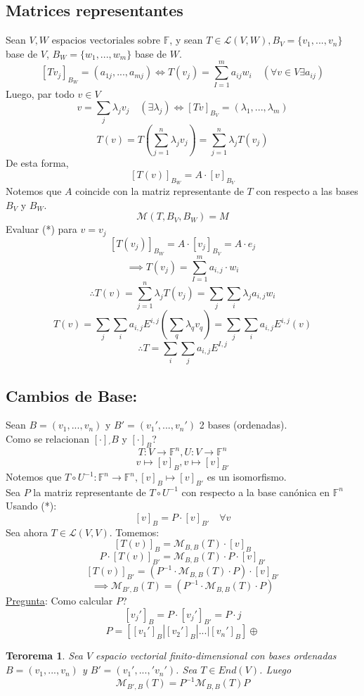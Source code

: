 \documentclass[11pt]{book}
\newtheorem{thm}{Terorema}[section]
\theoremstyle{definition}
\begin{document}
\subsection{Matrices representantes}
Sean $V,W$ espacios vectoriales sobre $\mathbb{F}$, y sean $T\in\mathcal{L}(V,W),B_V=\{v_1,...,v_n\}$ base de $V$, $B_W=\{w_1,...,w_m\}$ base de $W$.
\[ [Tv_j]_{B_W}=(a_{1j},...,a_{mj})\iff T(v_j)=\sum^m_{I=1}a_{ij}w_i\quad (\forall v\in V \exists a_{ij})\]
Luego, par todo $v\in V$
\[v=\sum_j\lambda_jv_j\quad(\exists \lambda_j)\iff [Tv]_{B_V}=(\lambda_{1},...,\lambda_{m})\]
\[T(v)=T\left(\sum^n_{j=1}\lambda_j v_j\right)=\sum^n_{j=1}\lambda_jT(v_j)\]
De esta forma,
\[ [T(v)]_{B_W}=A\cdot [v]_{B_V}\]
Notemos que $A$ coincide con la matriz representante de $T$ con respecto a las bases $B_V$ y $B_W$.
\[\mathcal{M}(T,B_V,B_W)=M\]
Evaluar (*) para $v=v_j$
\[[T(v_j)]_{B_W}=A\cdot[v_j]_{B_V}=A\cdot e_j\]
\[\implies T(v_j)=\sum^m_{I=1}a_{i,j}\cdot w_i\]
\[\therefore T(v)=\sum^n_{j=1}\lambda_jT(v_j)=\sum_j\sum_i\lambda_ja_{i,j}w_i\]
\[T(v)=\sum_j\sum_ia_{i,j}E^{i,j}(\sum_q\lambda_qv_q)=\sum_j\sum_ia_{i,j}E^{i,j}(v)\]
\[\therefore T=\sum_i\sum_ja_{i,j}E^{I,j}\]
\subsection{Cambios de Base:}
Sean $B=(v_1,...,v_n)$ y $B'=(v_1',...,v_n')$ 2 bases (ordenadas).\\
Como se relacionan $[\cdot ]_{'}B$ y $[\cdot ]_{B}$?
\[ T:V\rightarrow\mathbb{F}^n,U:V\rightarrow\mathbb{F}^n\]
\[v\mapsto [v]_B,v\mapsto [v]_{B'}\]
Notemos que $T\circ U^{-1}:\mathbb{F}^n\rightarrow\mathbb{F}^n,[v]_B\mapsto [v]_{B'}$ es un isomorfismo.\\
Sea $P$ la matriz representante de $T\circ U^{-1}$ con respecto a la base canónica en $\mathbb{F}^n$\\
Usando (*):
\[ [v]_B=P\cdot [v]_{B'}\quad \forall v\]
Sea ahora $T\in\mathcal{L}(V,V)$. Tomemos:
\[[T(v)]_B=\mathcal{M}_{B,B}(T)\cdot [v]_B\]
\[ P\cdot [T(v)]_{B'}=\mathcal{M}_{B,B}(T)\cdot P\cdot [v]_{B'}\]
\[[T(v)]_{B'}=\left(P^{-1}\cdot\mathcal{M}_{B,B}(T)\cdot P\right)\cdot [v]_{B'}\]
\[\implies \mathcal{M}_{B',B}(T)=\left(P^{-1}\cdot\mathcal{M}_{B,B}(T)\cdot P\right)\]
\underline{Pregunta}: Como calcular $P$?
\[ [v_j']_B=P\cdot [v_j']_{B'}=P\cdot j\]
\[ P=\left[ [v_1']_B| [v_2']_B|...|[v_n']_B\right]\oplus\]
\begin{thm}
Sea $V$ espacio vectorial finito-dimensional con bases ordenadas $B=(v_1,...,v_n)$ y $B'=(v_1',...,'v_n')$. Sea $T\in End(V)$. Luego
\[\mathcal{M}_{B',B}(T)=P^{-1}\mathcal{M}_{B,B}(T)P\]
\end{thm}
\end{document}
